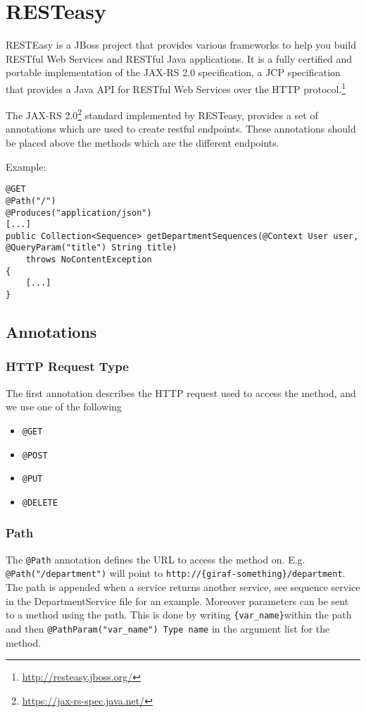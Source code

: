 \chapter{RESTeasy}\label{app:resteasy}
\begin{displayquote}
RESTEasy is a JBoss project that provides various frameworks to help you build RESTful Web Services and RESTful Java applications.
It is a fully certified and portable implementation of the JAX-RS 2.0 specification, a JCP specification that provides a Java API for RESTful Web Services over the HTTP protocol.\footnote{\url{http://resteasy.jboss.org/}}
\end{displayquote}

\noindent
The JAX-RS 2.0\footnote{\url{https://jax-rs-spec.java.net/}} standard implemented by RESTeasy, provides a set of annotations which are used to create restful endpoints. These annotations should be placed above the methods which are the different endpoints.

\bigskip\noindent
Example:
\begin{lstlisting}
@GET
@Path("/")
@Produces("application/json")
[...]
public Collection<Sequence> getDepartmentSequences(@Context User user, @QueryParam("title") String title)
    throws NoContentException
{
    [...]
}
\end{lstlisting}

\section{Annotations}

\subsection{HTTP Request Type}
The first annotation describes the HTTP request used to access the method, and we use one of the following
\begin{itemize}
    \item \texttt{@GET}
    \item \texttt{@POST}
    \item \texttt{@PUT}
    \item \texttt{@DELETE}
\end{itemize}

\subsection{Path}
The \texttt{@Path} annotation defines the URL to access the method on. E.g. \texttt{@Path("/department")} will point to \texttt{http://\{giraf-something\}/department}.
The path is appended when a service returns another service, see sequence service in the DepartmentService file for an example.
Moreover parameters can be sent to a method using the path. This is done by writing \texttt{\{var\_name\}}within the path and then \texttt{@PathParam("var\_name") Type name} in the argument list for the method.

